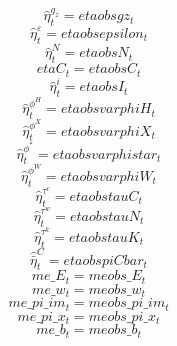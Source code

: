 \begin{dmath}
{\hat{\eta}^{g_z}_{t}}={etaobsgz_{t}}
\end{dmath}
\begin{dmath}
{\hat{\eta}^{\varepsilon}_{t}}={etaobsepsilon_{t}}
\end{dmath}
\begin{dmath}
{\hat{\eta}^{N}_{t}}={etaobsN_{t}}
\end{dmath}
\begin{dmath}
{etaC_{t}}={etaobsC_{t}}
\end{dmath}
\begin{dmath}
{\hat{\eta}^{i}_{t}}={etaobsI_{t}}
\end{dmath}
\begin{dmath}
{\hat{\eta}^{\phi^H}_{t}}={etaobsvarphiH_{t}}
\end{dmath}
\begin{dmath}
{\hat{\eta}^{\phi^X}_{t}}={etaobsvarphiX_{t}}
\end{dmath}
\begin{dmath}
{\hat{\eta}^{\phi^*}_{t}}={etaobsvarphistar_{t}}
\end{dmath}
\begin{dmath}
{\hat{\eta}^{\phi^W}_{t}}={etaobsvarphiW_{t}}
\end{dmath}
\begin{dmath}
{\hat{\eta}^{\tau^c}_{t}}={etaobstauC_{t}}
\end{dmath}
\begin{dmath}
{\hat{\eta}^{\tau^w}_{t}}={etaobstauN_{t}}
\end{dmath}
\begin{dmath}
{\hat{\eta}^{\tau^k}_{t}}={etaobstauK_{t}}
\end{dmath}
\begin{dmath}
{\hat{\bar{\eta}}^C_{t}}={etaobspiCbar_{t}}
\end{dmath}
\begin{dmath}
{me\_E_{t}}={meobs\_E_{t}}
\end{dmath}
\begin{dmath}
{me\_w_{t}}={meobs\_w_{t}}
\end{dmath}
\begin{dmath}
{me\_pi\_im_{t}}={meobs\_pi\_im_{t}}
\end{dmath}
\begin{dmath}
{me\_pi\_x_{t}}={meobs\_pi\_x_{t}}
\end{dmath}
\begin{dmath}
{me\_b_{t}}={meobs\_b_{t}}
\end{dmath}
